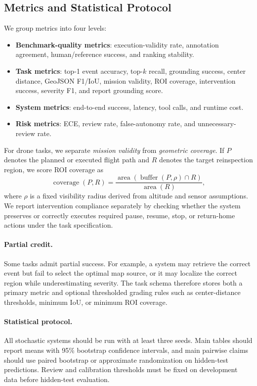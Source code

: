 \documentclass{article}
\begin{document}
\subsection{Metrics and Statistical Protocol}

We group metrics into four levels:
\begin{itemize}[leftmargin=1.2em]
    \item \textbf{Benchmark-quality metrics}: execution-validity rate, annotation agreement, human/reference success, and ranking stability.
    \item \textbf{Task metrics}: top-1 event accuracy, top-$k$ recall, grounding success, center distance, GeoJSON F1/IoU, mission validity, ROI coverage, intervention success, severity F1, and report grounding score.
    \item \textbf{System metrics}: end-to-end success, latency, tool calls, and runtime cost.
    \item \textbf{Risk metrics}: ECE, review rate, false-autonomy rate, and unnecessary-review rate.
\end{itemize}

For drone tasks, we separate \emph{mission validity} from \emph{geometric coverage}. If $P$ denotes the planned or executed flight path and $R$ denotes the target reinspection region, we score ROI coverage as
\[
\operatorname{coverage}(P,R) = \frac{\operatorname{area}(\operatorname{buffer}(P,\rho)\cap R)}{\operatorname{area}(R)},
\]
where $\rho$ is a fixed visibility radius derived from altitude and sensor assumptions. We report intervention compliance separately by checking whether the system preserves or correctly executes required pause, resume, stop, or return-home actions under the task specification.

\paragraph{Partial credit.}
Some tasks admit partial success. For example, a system may retrieve the correct event but fail to select the optimal map source, or it may localize the correct region while underestimating severity. The task schema therefore stores both a primary metric and optional thresholded grading rules such as center-distance thresholds, minimum IoU, or minimum ROI coverage.

\paragraph{Statistical protocol.}
All stochastic systems should be run with at least three seeds. Main tables should report means with 95\% bootstrap confidence intervals, and main pairwise claims should use paired bootstrap or approximate randomization on hidden-test predictions. Review and calibration thresholds must be fixed on development data before hidden-test evaluation.
\end{document}
